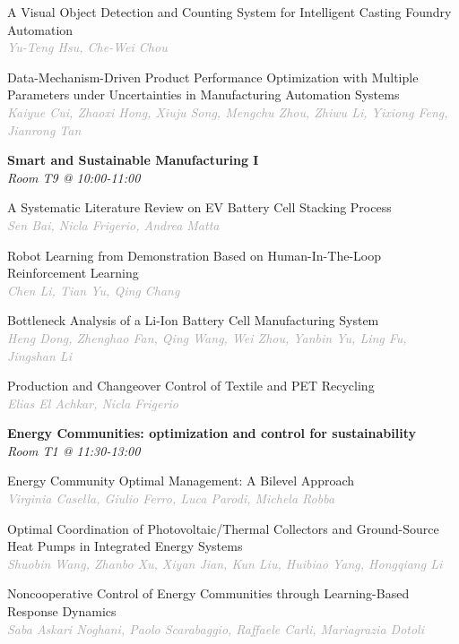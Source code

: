 \begin{multicols*}{2}
\small A Visual Object Detection and Counting System for Intelligent Casting Foundry Automation\\ 
\footnotesize \textcolor{darkgray}{\textit{Yu-Teng Hsu, Che-Wei  Chou}}

\small Data-Mechanism-Driven Product Performance Optimization with Multiple Parameters under Uncertainties in Manufacturing Automation Systems\\ 
\footnotesize \textcolor{darkgray}{\textit{Kaiyue Cui, Zhaoxi  Hong, Xiuju  Song, Mengchu  Zhou, Zhiwu  Li, Yixiong  Feng, Jianrong  Tan}}

\normalsize \textbf{Smart and Sustainable Manufacturing I}\\
\small \textit{Room T9 @ 10:00-11:00}

\small A Systematic Literature Review on EV Battery Cell Stacking Process\\ 
\footnotesize \textcolor{darkgray}{\textit{Sen Bai, Nicla  Frigerio, Andrea  Matta}}

\small Robot Learning from Demonstration Based on Human-In-The-Loop Reinforcement Learning\\ 
\footnotesize \textcolor{darkgray}{\textit{Chen Li, Tian  Yu, Qing  Chang}}

\small Bottleneck Analysis of a Li-Ion Battery Cell Manufacturing System\\ 
\footnotesize \textcolor{darkgray}{\textit{Heng Dong, Zhenghao  Fan, Qing  Wang, Wei  Zhou, Yanbin  Yu, Ling  Fu, Jingshan  Li}}

\small Production and Changeover Control of Textile and PET Recycling\\ 
\footnotesize \textcolor{darkgray}{\textit{Elias El Achkar, Nicla  Frigerio}}

\normalsize \textbf{Energy Communities: optimization and control for sustainability}\\
\small \textit{Room T1 @ 11:30-13:00}

\small Energy Community Optimal Management: A Bilevel Approach\\ 
\footnotesize \textcolor{darkgray}{\textit{Virginia Casella, Giulio  Ferro, Luca  Parodi, Michela  Robba}}

\small Optimal Coordination of Photovoltaic/Thermal Collectors and Ground-Source Heat Pumps in Integrated Energy Systems\\ 
\footnotesize \textcolor{darkgray}{\textit{Shuobin Wang, Zhanbo  Xu, Xiyan  Jian, Kun  Liu, Huibiao  Yang, Hongqiang  Li}}

\small Noncooperative Control of Energy Communities through Learning-Based Response Dynamics\\ 
\footnotesize \textcolor{darkgray}{\textit{Saba Askari Noghani, Paolo  Scarabaggio, Raffaele  Carli, Mariagrazia  Dotoli}}


\end{multicols*}
